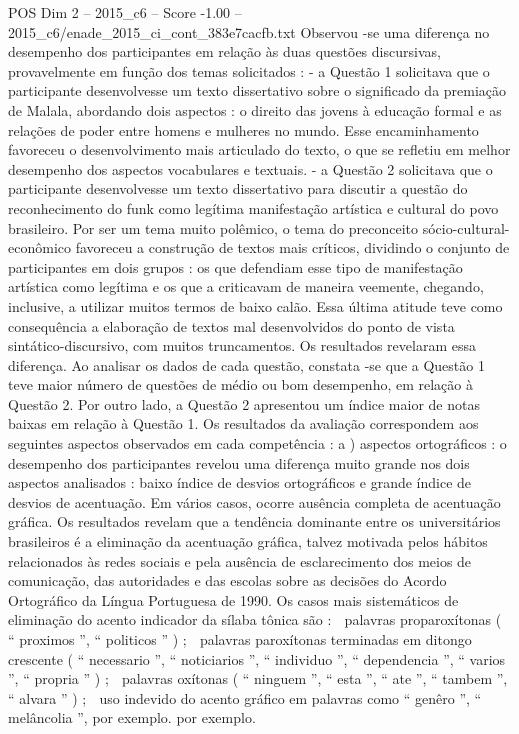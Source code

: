 \begin{textsample}{POS Dim 2 – 2015\_c6 – Score -1.00 – 2015\_c6/enade\_2015\_ci\_cont\_383e7cacfb.txt}
Observou -se uma diferença no desempenho dos participantes em relação às duas questões discursivas, provavelmente em função dos temas solicitados : - a Questão 1 solicitava que o participante desenvolvesse um texto dissertativo sobre o significado da premiação de Malala, abordando dois aspectos : o direito das jovens à educação formal e as relações de poder entre homens e mulheres no mundo.
Esse encaminhamento favoreceu o desenvolvimento mais articulado do texto, o que se refletiu em melhor desempenho dos aspectos vocabulares e textuais. - a Questão 2 solicitava que o participante desenvolvesse um texto dissertativo para discutir a questão do reconhecimento do funk como legítima manifestação artística e cultural do povo brasileiro.
Por ser um tema muito polêmico, o tema do preconceito sócio-cultural-econômico favoreceu a construção de textos mais críticos, dividindo o conjunto de participantes em dois grupos : os que defendiam esse tipo de manifestação artística como legítima e os que a criticavam de maneira veemente, chegando, inclusive, a utilizar muitos termos de baixo calão.
Essa última atitude teve como consequência a elaboração de textos mal desenvolvidos do ponto de vista sintático-discursivo, com muitos truncamentos.
Os resultados revelaram essa diferença.
Ao analisar os dados de cada questão, constata -se que a Questão 1 teve maior número de questões de médio ou bom desempenho, em relação à Questão 2.
Por outro lado, a Questão 2 apresentou um índice maior de notas baixas em relação à Questão 1.
Os resultados da avaliação correspondem aos seguintes aspectos observados em cada competência : a ) aspectos ortográficos : o desempenho dos participantes revelou uma diferença muito grande nos dois aspectos analisados : baixo índice de desvios ortográficos e grande índice de desvios de acentuação.
Em vários casos, ocorre ausência completa de acentuação gráfica.
Os resultados revelam que a tendência dominante entre os universitários brasileiros é a eliminação da acentuação gráfica, talvez motivada pelos hábitos relacionados às redes sociais e pela ausência de esclarecimento dos meios de comunicação, das autoridades e das escolas sobre as decisões do Acordo Ortográfico da Língua Portuguesa de 1990.
Os casos mais sistemáticos de eliminação do acento indicador da sílaba tônica são :  palavras proparoxítonas ( “ proximos ”, “ politicos ” ) ;  palavras paroxítonas terminadas em ditongo crescente ( “ necessario ”, “ noticiarios ”, “ individuo ”, “ dependencia ”, “ varios ”, “ propria ” ) ;  palavras oxítonas ( “ ninguem ”, “ esta ”, “ ate ”, “ tambem ”, “ alvara ” ) ;  uso indevido do acento gráfico em palavras como “ genêro ”, “ melâncolia ”, por exemplo. por exemplo.

\end{textsample}
